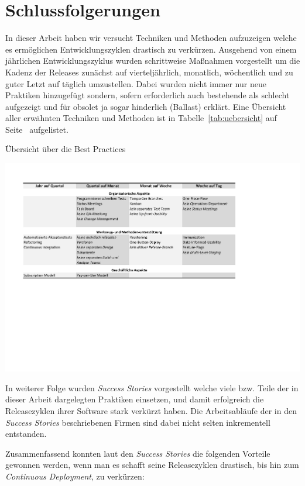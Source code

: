\section{Schlussfolgerungen}
\label{sec:schlussfolgerungen}

In dieser Arbeit haben wir versucht Techniken und Methoden aufzuzeigen welche
es ermöglichen Entwicklungszyklen drastisch zu verkürzen. Ausgehend von einem
jährlichen Entwicklungszyklus wurden schrittweise Maßnahmen vorgestellt um die
Kadenz der Releases zunächst auf vierteljährlich, monatlich, wöchentlich und
zu guter Letzt auf täglich umzustellen. Dabei wurden nicht immer nur neue
Praktiken hinzugefügt sondern, sofern erforderlich auch bestehende als
schlecht aufgezeigt und für obsolet ja sogar hinderlich (Ballast) erklärt.
Eine Übersicht aller erwähnten Techniken und Methoden ist in
Tabelle~\ref{tab:uebersicht} auf Seite~\pageref{tab:uebersicht} aufgelistet. 

\begin{table}[htbp]
    \centering
        \caption{Übersicht über die Best Practices}
        \includegraphics[trim = 50bp 265bp 185bp 56bp, clip, width=1.00\textwidth]{uebersicht}
    \label{tab:uebersicht}
\end{table}

In weiterer Folge wurden \emph{Success Stories} vorgestellt welche viele bzw.
Teile der in dieser Arbeit dargelegten Praktiken einsetzen, und damit
erfolgreich die Releasezyklen ihrer Software stark verkürzt haben. Die
Arbeitsabläufe der in den \emph{Success Stories} beschriebenen Firmen sind
dabei nicht selten inkrementell entstanden.

Zusammenfassend konnten laut den \emph{Success Stories} die folgenden Vorteile
gewonnen werden, wenn man es schafft seine Releasezyklen drastisch, bis hin
zum \emph{Continuous Deployment}, zu verkürzen:

